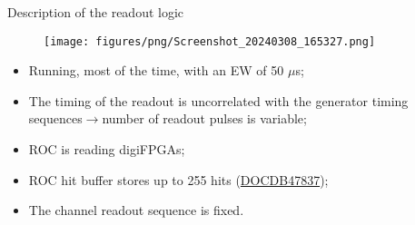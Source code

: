 \documentclass{beamer}[10pt]
\begin{document}
\begin{frame}{Description of the readout logic}
 \begin{figure}[H]
   \centering
   \texttt{[image: figures/png/Screenshot\_20240308\_165327.png]}
   \label{fig:djn}
 \end{figure}
\begin{itemize}
\item Running, most of the time, with an EW of 50 $\mu$s;
\item The timing of the readout is uncorrelated with the generator timing sequences$\rightarrow$number of readout pulses is variable;
\item ROC is reading digiFPGAs;
\item ROC hit buffer stores up to 255 hits (\href{https://mu2e-docdb.fnal.gov/cgi-bin/sso/RetrieveFile?docid=47837&filename=mu2e-47837.pdf&version=1}{DOCDB47837});
\item The channel readout sequence is fixed.
\end{itemize}
\end{frame}
\end{document}
